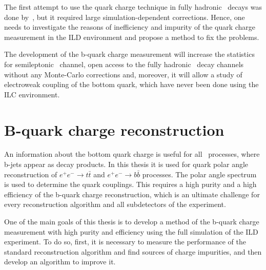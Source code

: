 The first attempt to use the quark charge technique in fully hadronic \ttbar\ decays was done by~\cite{amjad:tel-00949818}, but it required large simulation-dependent corrections. 
Hence, one needs to investigate the reasons of inefficiency and impurity of the quark charge measurement in the ILD environment and propose a method to fix the problems. 



The development of the b-quark charge measurement will increase the statistics for semileptonic \ttbar\ channel,  open access to the fully hadronic \ttbar\ decay channels without any Monte-Carlo corrections and, moreover, it will allow a study of electroweak coupling of the bottom quark, which have never been done using the ILC environment. 




\section{B-quark charge reconstruction}
\label{sec:JetChargeReconstruction}
An information about the bottom quark charge is useful for all \sm\ processes, where b-jets appear as decay products. 
In this thesis it is used for quark polar angle reconstruction of $e^+e^-\to t\bar{t}$ and $e^+e^- \to b\bar{b}$ processes. 
The polar angle spectrum is used to determine the quark couplings. 
This requires a high purity and a high efficiency of the b-quark charge reconstruction, which is an ultimate challenge for every reconstruction algorithm and all subdetectors of the experiment. 

One of the main goals of this thesis is to develop a method of the b-quark charge measurement with high purity and efficiency using the full simulation of the ILD experiment. 
To do so, first, it is necessary to measure the performance of the standard reconstruction algorithm and find sources of charge impurities, and then develop an algorithm to improve it. 


